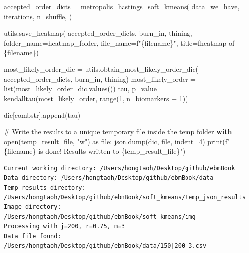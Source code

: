 \documentclass[
  letterpaper,
  DIV=11,
  numbers=noendperiod]{scrreprt}
\newenvironment{Shaded}{\begin{snugshade}}{\end{snugshade}}
\newcommand{\BuiltInTok}[1]{\textcolor[rgb]{0.00,0.23,0.31}{#1}}
\newcommand{\CommentTok}[1]{\textcolor[rgb]{0.37,0.37,0.37}{#1}}
\newcommand{\ControlFlowTok}[1]{\textcolor[rgb]{0.00,0.23,0.31}{\textbf{#1}}}
\newcommand{\DecValTok}[1]{\textcolor[rgb]{0.68,0.00,0.00}{#1}}
\newcommand{\ImportTok}[1]{\textcolor[rgb]{0.00,0.46,0.62}{#1}}
\newcommand{\NormalTok}[1]{\textcolor[rgb]{0.00,0.23,0.31}{#1}}
\newcommand{\OperatorTok}[1]{\textcolor[rgb]{0.37,0.37,0.37}{#1}}
\newcommand{\SpecialCharTok}[1]{\textcolor[rgb]{0.37,0.37,0.37}{#1}}
\newcommand{\SpecialStringTok}[1]{\textcolor[rgb]{0.13,0.47,0.30}{#1}}
\newcommand{\StringTok}[1]{\textcolor[rgb]{0.13,0.47,0.30}{#1}}
\begin{document}
\begin{Shaded}
\begin{Highlighting}[]
\NormalTok{    accepted\_order\_dicts }\OperatorTok{=}\NormalTok{ metropolis\_hastings\_soft\_kmeans(}
\NormalTok{        data\_we\_have,}
\NormalTok{        iterations,}
\NormalTok{        n\_shuffle,}
\NormalTok{    )}

\NormalTok{    utils.save\_heatmap(}
\NormalTok{        accepted\_order\_dicts,}
\NormalTok{        burn\_in, }
\NormalTok{        thining, }
\NormalTok{        folder\_name}\OperatorTok{=}\NormalTok{heatmap\_folder,}
\NormalTok{        file\_name}\OperatorTok{=}\SpecialStringTok{f"}\SpecialCharTok{\{}\NormalTok{filename}\SpecialCharTok{\}}\SpecialStringTok{"}\NormalTok{, }
\NormalTok{        title}\OperatorTok{=}\SpecialStringTok{f\textquotesingle{}heatmap of }\SpecialCharTok{\{}\NormalTok{filename}\SpecialCharTok{\}}\SpecialStringTok{\textquotesingle{}}\NormalTok{)}
    
\NormalTok{    most\_likely\_order\_dic }\OperatorTok{=}\NormalTok{ utils.obtain\_most\_likely\_order\_dic(}
\NormalTok{        accepted\_order\_dicts, burn\_in, thining)}
\NormalTok{    most\_likely\_order }\OperatorTok{=} \BuiltInTok{list}\NormalTok{(most\_likely\_order\_dic.values())}
\NormalTok{    tau, p\_value }\OperatorTok{=}\NormalTok{ kendalltau(most\_likely\_order, }\BuiltInTok{range}\NormalTok{(}\DecValTok{1}\NormalTok{, n\_biomarkers }\OperatorTok{+} \DecValTok{1}\NormalTok{))}
    
\NormalTok{    dic[combstr].append(tau)}
    
    \CommentTok{\# Write the results to a unique temporary file inside the temp folder}
    \ControlFlowTok{with} \BuiltInTok{open}\NormalTok{(temp\_result\_file, }\StringTok{"w"}\NormalTok{) }\ImportTok{as} \BuiltInTok{file}\NormalTok{:}
\NormalTok{        json.dump(dic, }\BuiltInTok{file}\NormalTok{, indent}\OperatorTok{=}\DecValTok{4}\NormalTok{)}
    \BuiltInTok{print}\NormalTok{(}\SpecialStringTok{f"}\SpecialCharTok{\{}\NormalTok{filename}\SpecialCharTok{\}}\SpecialStringTok{ is done! Results written to }\SpecialCharTok{\{}\NormalTok{temp\_result\_file}\SpecialCharTok{\}}\SpecialStringTok{"}\NormalTok{)}
\end{Highlighting}
\end{Shaded}

\begin{verbatim}
Current working directory: /Users/hongtaoh/Desktop/github/ebmBook
Data directory: /Users/hongtaoh/Desktop/github/ebmBook/data
Temp results directory: /Users/hongtaoh/Desktop/github/ebmBook/soft_kmeans/temp_json_results
Image directory: /Users/hongtaoh/Desktop/github/ebmBook/soft_kmeans/img
Processing with j=200, r=0.75, m=3
Data file found: /Users/hongtaoh/Desktop/github/ebmBook/data/150|200_3.csv
\end{verbatim}
\end{document}
